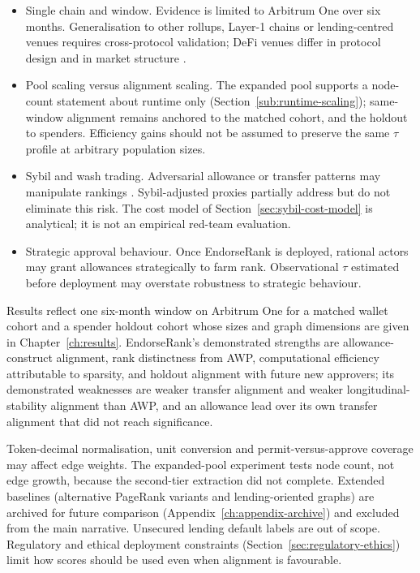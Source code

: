 
\begin{itemize}
\item Single chain and window. Evidence is limited to Arbitrum One over six months. Generalisation to other rollups, Layer-1 chains or lending-centred venues requires cross-protocol validation; DeFi venues differ in protocol design  and in market structure .
\item Pool scaling versus alignment scaling. The expanded pool supports a node-count statement about runtime only (Section~\ref{sub:runtime-scaling}); same-window alignment remains anchored to the matched cohort, and the holdout to spenders. Efficiency gains should not be assumed to preserve the same $\tau$ profile at arbitrary population sizes.
\end{itemize}


\begin{itemize}
\item Sybil and wash trading. Adversarial allowance or transfer patterns may manipulate rankings . Sybil-adjusted proxies partially address but do not eliminate this risk. The cost model of Section~\ref{sec:sybil-cost-model} is analytical; it is not an empirical red-team evaluation.
\item Strategic approval behaviour. Once EndorseRank is deployed, rational actors may grant allowances strategically to farm rank. Observational $\tau$ estimated before deployment may overstate robustness to strategic behaviour.
\end{itemize}


Results reflect one six-month window on Arbitrum One for a matched wallet cohort and a spender holdout cohort whose sizes and graph dimensions are given in Chapter~\ref{ch:results}. EndorseRank's demonstrated strengths are allowance-construct alignment, rank distinctness from AWP, computational efficiency attributable to sparsity, and holdout alignment with future new approvers; its demonstrated weaknesses are weaker transfer alignment and weaker longitudinal-stability alignment than AWP, and an allowance lead over its own transfer alignment that did not reach significance.

Token-decimal normalisation, unit conversion and permit-versus-approve coverage may affect edge weights. The expanded-pool experiment tests node count, not edge growth, because the second-tier extraction did not complete. Extended baselines (alternative PageRank variants and lending-oriented graphs) are archived for future comparison (Appendix~\ref{ch:appendix-archive}) and excluded from the main narrative. Unsecured lending default labels are out of scope. Regulatory and ethical deployment constraints (Section~\ref{sec:regulatory-ethics}) limit how scores should be used even when alignment is favourable.

